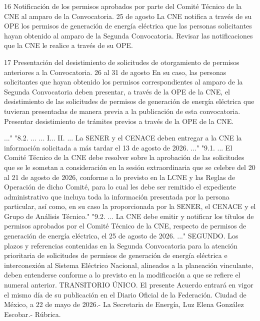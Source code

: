  16
 Notificación de los permisos aprobados por parte del Comité Técnico de la CNE al amparo de la Convocatoria.
 25 de agosto
 La CNE notifica a través de su OPE los permisos de generación de energía eléctrica que las personas solicitantes hayan obtenido al amparo de la Segunda Convocatoria.
 Revisar las notificaciones que la CNE le realice a través de su OPE.
 
 17
 Presentación del desistimiento de solicitudes de otorgamiento de permisos anteriores a la Convocatoria.
 26 al 31 de agosto
 En su caso, las personas solicitantes que hayan obtenido los permisos correspondientes al amparo de la Segunda Convocatoria deben presentar, a través de la OPE de la CNE, el desistimiento de las solicitudes de permisos de generación de energía eléctrica que tuvieran presentadas de manera previa a la publicación de esta convocatoria.
 Presentar desistimiento de trámites previos a través de la OPE de la CNE.
 
 
..."
"8.2. ...
...
I...
II. ...
La SENER y el CENACE deben entregar a la CNE la información solicitada a más tardar el 13 de agosto de 2026.
..."
"9.1. ...
El Comité Técnico de la CNE debe resolver sobre la aprobación de las solicitudes que se le sometan a consideración en la sesión extraordinaria que se celebre del 20 al 21 de agosto de 2026, conforme a lo previsto en la LCNE y las Reglas de Operación de dicho Comité, para lo cual les debe ser remitido el expediente administrativo que incluya toda la información presentada por la persona particular, así como, en su caso la proporcionada por la SENER, el CENACE y el Grupo de Análisis Técnico."
"9.2. ...
La CNE debe emitir y notificar los títulos de permisos aprobados por el Comité Técnico de la CNE, respecto de permisos de generación de energía eléctrica, el 25 de agosto de 2026.
..."
SEGUNDO. Los plazos y referencias contenidas en la Segunda Convocatoria para la atención prioritaria de solicitudes de permisos de generación de energía eléctrica e interconexión al Sistema Eléctrico Nacional, alineados a la planeación vinculante, deben entenderse conforme a lo previsto en la modificación a que se refiere el numeral anterior.
TRANSITORIO
ÚNICO. El presente Acuerdo entrará en vigor el mismo día de su publicación en el Diario Oficial  de la Federación.
Ciudad de México, a 22 de mayo de 2026.- La Secretaria de Energía, Luz Elena González Escobar.- Rúbrica.\par
\endgroup
